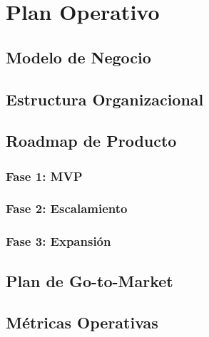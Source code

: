 
\chapter{Plan Operativo}
\label{chap:plan-operativo}

\section{Modelo de Negocio}
\label{sec:modelo-negocio}

\section{Estructura Organizacional}
\label{sec:estructura-organizacional}

\section{Roadmap de Producto}
\label{sec:roadmap}

\subsection{Fase 1: MVP}
\label{subsec:fase1-mvp}

\subsection{Fase 2: Escalamiento}
\label{subsec:fase2-escala}

\subsection{Fase 3: Expansión}
\label{subsec:fase3-expansion}

\section{Plan de Go-to-Market}
\label{sec:go-to-market}

\section{Métricas Operativas}
\label{sec:metricas-operativas}
